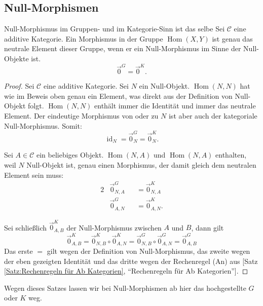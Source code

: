 \documentclass[a4paper]{amsart}
\theoremstyle{definition}
\newcommand{\myRef}[2]{[#1 \ref{#1:#2}, ``#2'']}
\DeclareMathOperator{\id}{id}
\DeclareMathOperator{\Hom}{Hom}
\newcommand{\CC}{\ensuremath{\mathcal{ C }}}
\begin{document}
\subsection{Null-Morphismen}
\begin{Satz}{Null-Morphismus im Gruppen- und im Kategorie-Sinn ist das selbe}
   Sei $\CC$ eine additive Kategorie. Ein Morphismus in der Gruppe $\Hom( X, Y)$ ist genau das neutrale Element dieser Gruppe, wenn er ein Null-Morphismus im Sinne der Null-Objekte ist.
   \begin{equation}
      \vec 0^G = \vec 0^K.
   \end{equation}
\end{Satz}
\begin{proof}
   Sei $\CC$ eine additive Kategorie. Sei $N$ ein Null-Objekt. $\Hom(N,N)$ hat wie im Beweis oben genau ein Element, was direkt aus der Definition von Null-Objekt folgt. $\Hom(N,N)$ enthält immer die Identität und immer das neutrale Element. Der eindeutige Morphismus von oder zu $N$ ist aber auch der kategoriale Null-Morphismus. Somit: 
   \begin{equation}
      \id_N = \vec 0^G_N = \vec 0^K_N.
   \end{equation}

   Sei $A \in \CC$ ein beliebiges Objekt. $\Hom( N, A)$ und $\Hom( N, A)$ enthalten, weil $N$ Null-Objekt ist, genau einen Morphismus, der damit gleich dem neutralen Element sein muss:
   \begin{alignat}{2}
      &\vec 0^G_{N,A} &&= \vec 0^K_{N,A}\\
      &\vec 0^G_{A,N} &&= \vec 0^K_{A,N}.
   \end{alignat}
   
   Sei schließlich $\vec 0^K_{A,B}$ der Null-Morphismus zwischen $A$ und $B$, dann gilt
   \begin{equation}
      \vec 0^K_{A,B} = \vec 0^K_{N,B} \circ \vec 0^K_{A,N} = \vec 0^G_{N,B} \circ \vec 0^G_{A,N} = \vec 0^G_{A,B}
   \end{equation}
   Das erste $=$ gilt wegen der Definition von Null-Morphismus, das zweite wegen der eben gezeigten Identität und das dritte wegen der Rechenregel (An) aus \myRef{Satz}{Rechenregeln für Ab Kategorien}.
\end{proof}

Wegen dieses Satzes lassen wir bei Null-Morphismen ab hier das hochgestellte $G$ oder $K$ weg.
\end{document}
